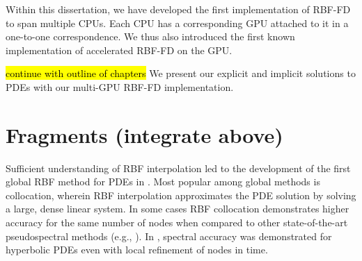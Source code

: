 Within this dissertation, we have developed the first implementation of RBF-FD
to span multiple CPUs. Each CPU has a corresponding GPU attached to it
in a one-to-one correspondence. We thus also introduced the first known 
implementation of accelerated RBF-FD on the GPU.

 \hl{continue with outline of chapters} 
We present our explicit and implicit solutions to PDEs with our multi-GPU RBF-FD implementation. 


\section{Fragments (integrate above) }



Sufficient understanding of RBF interpolation led to the development of the first global RBF method for PDEs in \cite{Kansa1990a}. Most popular among global methods is collocation, wherein RBF interpolation approximates the PDE solution by solving a large, dense linear system. 
In some cases RBF collocation demonstrates higher accuracy for the same number of nodes when compared to other state-of-the-art pseudospectral methods (e.g., \cite{Larsson2003} \cite{Flyer2007} \cite{Flyer2009b}). In \cite{Flyer2010}, spectral accuracy was demonstrated for hyperbolic PDEs even with local refinement of nodes in time.


